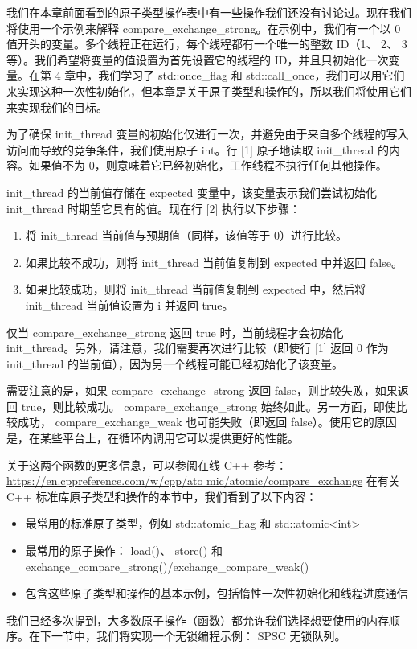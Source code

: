 我们在本章前面看到的原子类型操作表中有一些操作我们还没有讨论过。现在我们将使用一个示例来解释 compare\_exchange\_strong。在示例中，我们有一个以 0 值开头的变量。多个线程正在运行，每个线程都有一个唯一的整数 ID（1、 2、 3 等）。我们希望将变量的值设置为首先设置它的线程的 ID，并且只初始化一次变量。在第 4 章中，我们学习了 std::once\_flag 和 std::call\_once，我们可以用它们来实现这种一次性初始化，但本章是关于原子类型和操作的，所以我们将使用它们来实现我们的目标。

为了确保 init\_thread 变量的初始化仅进行一次，并避免由于来自多个线程的写入访问而导致的竞争条件，我们使用原子 int。行 [1] 原子地读取 init\_thread 的内容。如果值不为 0，则意味着它已经初始化，工作线程不执行任何其他操作。

init\_thread 的当前值存储在 expected 变量中，该变量表示我们尝试初始化 init\_thread 时期望它具有的值。现在行 [2] 执行以下步骤：

\begin{enumerate}
\item
将 init\_thread 当前值与预期值（同样，该值等于 0）进行比较。

\item
如果比较不成功，则将 init\_thread 当前值复制到 expected 中并返回 false。

\item
如果比较成功，则将 init\_thread 当前值复制到 expected 中，然后将 init\_thread 当前值设置为 i 并返回 true。
\end{enumerate}

仅当 compare\_exchange\_strong 返回 true 时，当前线程才会初始化 init\_thread。另外，请注意，我们需要再次进行比较（即使行 [1] 返回 0 作为 init\_thread 的当前值），因为另一个线程可能已经初始化了该变量。

需要注意的是，如果 compare\_exchange\_strong 返回 false，则比较失败，如果返回 true，则比较成功。 compare\_exchange\_strong 始终如此。另一方面，即使比较成功， compare\_exchange\_weak 也可能失败（即返回 false）。使用它的原因是，在某些平台上，在循环内调用它可以提供更好的性能。

关于这两个函数的更多信息，可以参阅在线 C++ 参考： \url{https://en.cppreference.com/w/cpp/ato mic/atomic/compare_exchange} 在有关 C++ 标准库原子类型和操作的本节中，我们看到了以下内容：

\begin{itemize}
\item
最常用的标准原子类型，例如 std::atomic\_flag 和 std::atomic<int>

\item
最常用的原子操作： load()、 store() 和 exchange\_compare\_strong()/exchange\_compare\_weak()

\item
包含这些原子类型和操作的基本示例，包括惰性一次性初始化和线程进度通信
\end{itemize}

我们已经多次提到，大多数原子操作（函数）都允许我们选择想要使用的内存顺序。在下一节中，我们将实现一个无锁编程示例： SPSC 无锁队列。

